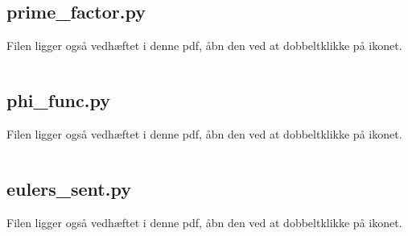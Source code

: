 \subsection{prime\_factor.py}
\label{file:prime_factor}
Filen ligger også vedhæftet i denne pdf, åbn den ved at dobbeltklikke på ikonet.
\inputminted[python3, linenos, breaklines, frame=lines, fontsize=\footnotesize]{python}{src/prime_factor.py}


\subsection{phi\_func.py}
\label{file:phi_func}
Filen ligger også vedhæftet i denne pdf, åbn den ved at dobbeltklikke på ikonet.
\inputminted[python3, linenos, breaklines, frame=lines, fontsize=\footnotesize]{python}{src/phi_func.py}


\subsection{eulers\_sent.py}
\label{file:eulers_sent}
Filen ligger også vedhæftet i denne pdf, åbn den ved at dobbeltklikke på ikonet.
\inputminted[python3, linenos, breaklines, frame=lines, fontsize=\footnotesize]{python}{src/eulers_sent.py}
